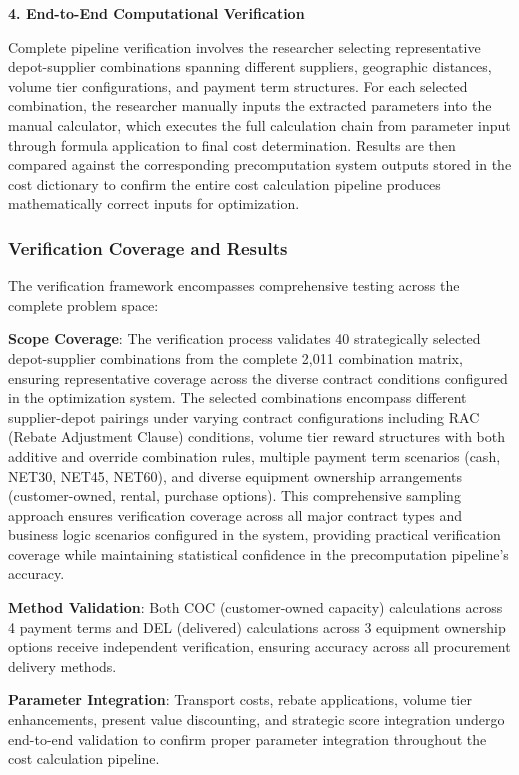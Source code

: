 \textbf{4. End-to-End Computational Verification}

Complete pipeline verification involves the researcher selecting representative depot-supplier combinations spanning different suppliers, geographic distances, volume tier configurations, and payment term structures. For each selected combination, the researcher manually inputs the extracted parameters into the manual calculator, which executes the full calculation chain from parameter input through formula application to final cost determination. Results are then compared against the corresponding precomputation system outputs stored in the cost dictionary to confirm the entire cost calculation pipeline produces mathematically correct inputs for optimization.

\subsubsection{Verification Coverage and Results}

The verification framework encompasses comprehensive testing across the complete problem space:

\textbf{Scope Coverage}: The verification process validates 40 strategically selected depot-supplier combinations from the complete 2,011 combination matrix, ensuring representative coverage across the diverse contract conditions configured in the optimization system. The selected combinations encompass different supplier-depot pairings under varying contract configurations including RAC (Rebate Adjustment Clause) conditions, volume tier reward structures with both additive and override combination rules, multiple payment term scenarios (cash, NET30, NET45, NET60), and diverse equipment ownership arrangements (customer-owned, rental, purchase options). This comprehensive sampling approach ensures verification coverage across all major contract types and business logic scenarios configured in the system, providing practical verification coverage while maintaining statistical confidence in the precomputation pipeline's accuracy.

\textbf{Method Validation}: Both COC (customer-owned capacity) calculations across 4 payment terms and DEL (delivered) calculations across 3 equipment ownership options receive independent verification, ensuring accuracy across all procurement delivery methods.

\textbf{Parameter Integration}: Transport costs, rebate applications, volume tier enhancements, present value discounting, and strategic score integration undergo end-to-end validation to confirm proper parameter integration throughout the cost calculation pipeline.

